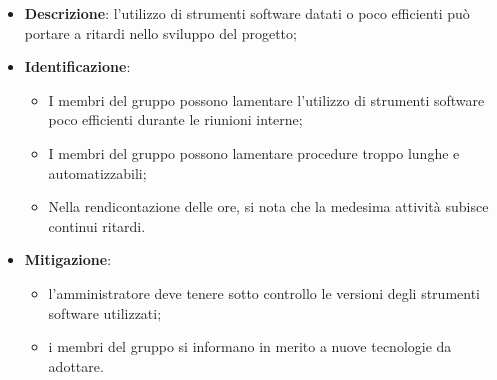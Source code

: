 \label{risk:strumenti software inadeguati}
\begin{itemize}
	\item \textbf{Descrizione}: l'utilizzo di strumenti software datati o poco
	      efficienti può portare a ritardi nello sviluppo del progetto;

	\item \textbf{Identificazione}:
	      \begin{itemize}
		      \item I membri del gruppo possono lamentare l'utilizzo di
		            strumenti software poco efficienti durante le riunioni
		            interne;

		      \item I membri del gruppo possono lamentare procedure troppo
		            lunghe e automatizzabili;

		      \item Nella rendicontazione delle ore, si nota che la medesima
		            attività subisce continui ritardi.
	      \end{itemize}

	\item \textbf{Mitigazione}:
	      \begin{itemize}
		      \item l'amministratore deve tenere sotto controllo le versioni
		            degli strumenti software utilizzati;

		      \item i membri del gruppo si informano in merito a nuove
		            tecnologie da adottare.
	      \end{itemize}
\end{itemize}
